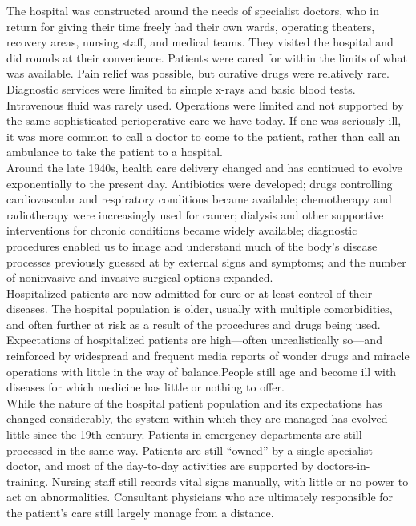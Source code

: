 \documentclass[a4paper,12pt]{report}
\begin{document}
The hospital was constructed around the needs of specialist doctors, who in return for giving their time freely had their own wards, operating  theaters, recovery areas, nursing staff, and medical teams. They visited the hospital and did rounds at their convenience. Patients were cared for within the limits of what was available. Pain relief was possible, but curative drugs were relatively rare. Diagnostic services were limited to simple x-rays and basic blood tests. Intravenous fluid was rarely used. Operations were limited and not supported by the same sophisticated perioperative care we have today. If one was seriously ill, it was more common to call a doctor to come to the patient, rather than call an ambulance to take the patient to a hospital.\\

Around the late 1940s, health care delivery changed and has continued to evolve exponentially to the present day. Antibiotics were developed; drugs controlling cardiovascular and respiratory conditions became available; chemotherapy and radiotherapy were increasingly used for cancer; dialysis and other supportive interventions for chronic conditions became widely available; diagnostic procedures enabled us to image and understand much of the body’s disease processes previously guessed at by external signs  and symptoms; and the number of noninvasive and invasive surgical options expanded.\\

Hospitalized patients are now admitted for cure or at least control of their diseases. The hospital population is older, usually with multiple comorbidities, and often further at risk as a result of the procedures and drugs being used. Expectations of hospitalized patients are high—often unrealistically so—and reinforced by widespread and frequent media reports of wonder drugs and miracle operations with little in the way of balance.People still age and become ill with diseases for which medicine has little or nothing to offer.\\

While the nature of the hospital patient population and its expectations has changed considerably, the system within which they are managed has evolved little since the 19th century. Patients in emergency departments are still processed in the same way. Patients are still “owned” by a single specialist doctor, and most of the day-to-day activities are supported by doctors-in-training. Nursing staff still records vital signs manually, with little or no power to act on abnormalities. Consultant physicians who are ultimately responsible for the patient’s care still largely manage from a distance.\\
\end{document}
